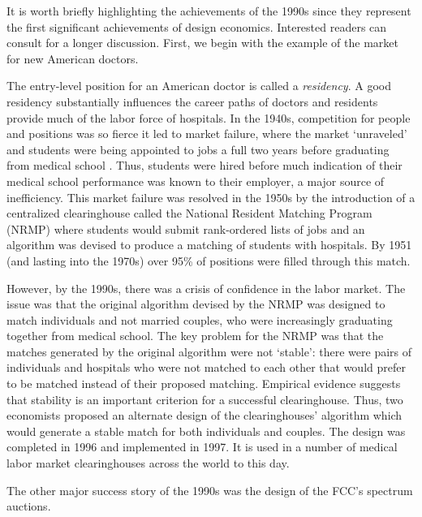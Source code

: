 It is worth briefly highlighting the achievements of the 1990s since they represent the first significant achievements of design economics. Interested readers can consult \autocite{roth2002} for a longer discussion. First, we begin with the example of the market for new American doctors.

\begin{example}
    The entry-level position for an American doctor is called a \textit{residency}. A good residency substantially influences the career paths of doctors and residents provide much of the labor force of hospitals. In the 1940s, competition for people and positions was so fierce it led to market failure, where the market `unraveled' and students were being appointed to jobs a full two years before graduating from medical school \autocite[p1346]{roth2002}. Thus, students were hired before much indication of their medical school performance was known to their employer, a major source of inefficiency. This market failure was resolved in the 1950s by the introduction of a centralized clearinghouse called the National Resident Matching Program (NRMP) where students would submit rank-ordered lists of jobs and an algorithm was devised to produce a matching of students with hospitals. By 1951 (and lasting into the 1970s) over 95\% of positions were filled through this match.

    However, by the 1990s, there was a crisis of confidence in the labor market. The issue was that the original algorithm devised by the NRMP was designed to match individuals and not married couples, who were increasingly graduating together from medical school. The key problem for the NRMP was that the matches generated by the original algorithm were not `stable': there were pairs of individuals and hospitals who were not matched to each other that would prefer to be matched instead of their proposed matching. Empirical evidence suggests that stability is an important criterion for a successful clearinghouse. Thus, two economists \autocite{roth1999} proposed an alternate design of the clearinghouses' algorithm which would generate a stable match for both individuals and couples. The design was completed in 1996 and implemented in 1997. It is used in a number of medical labor market clearinghouses across the world to this day.
\end{example}

\noindent The other major success story of the 1990s was the design of the FCC's spectrum auctions.

